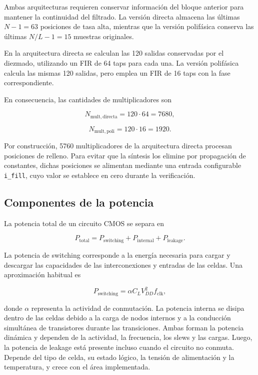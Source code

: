 \documentclass[10pt,a4paper]{article}
\begin{document}
Ambas arquitecturas requieren conservar información del bloque
anterior para mantener la continuidad del filtrado. La versión
directa almacena las últimas $N-1=63$ posiciones de tasa alta,
mientras que la versión polifásica conserva las últimas
$N/L-1=15$ muestras originales.

En la arquitectura directa se calculan las 120 salidas conservadas
por el diezmado, utilizando un FIR de 64 taps para cada una.
La versión polifásica calcula las mismas 120 salidas, pero emplea
un FIR de 16 taps con la fase correspondiente.

En consecuencia, las cantidades de multiplicadores son

\begin{equation}
N_{\mathrm{mult,directa}}=120\cdot64=7680,
\label{eq:mult-direct}
\end{equation}

\begin{equation}
N_{\mathrm{mult,poli}}=120\cdot16=1920.
\label{eq:mult-poly}
\end{equation}

Por construcción, 5760 multiplicadores de la arquitectura directa
procesan posiciones de relleno. Para evitar que la síntesis los
elimine por propagación de constantes, dichas posiciones se
alimentan mediante una entrada configurable \texttt{i\_fill},
cuyo valor se establece en cero durante la verificación.

\subsection{Componentes de la potencia}

La potencia total de un circuito CMOS se separa en

\begin{equation}
P_{\mathrm{total}}=P_{\mathrm{switching}}+P_{\mathrm{internal}}+P_{\mathrm{leakage}}.
\label{eq:power-components}
\end{equation}

La potencia de switching corresponde a la energía necesaria para cargar y descargar
las capacidades de las interconexiones y entradas de las celdas. Una aproximación
habitual es

\begin{equation}
P_{\mathrm{switching}}=\alpha C_L V_{DD}^{2}f_{\mathrm{clk}},
\label{eq:switching-power}
\end{equation}

donde $\alpha$ representa la actividad de conmutación. La potencia interna se
disipa dentro de las celdas debido a la carga de nodos internos y a la conducción
simultánea de transistores durante las transiciones. Ambas forman la potencia
dinámica y dependen de la actividad, la frecuencia, los slews y las cargas. Luego,
la potencia de leakage está presente incluso cuando el circuito no conmuta. Depende
del tipo de celda, su estado lógico, la tensión de alimentación y la temperatura, y
crece con el área implementada.
\end{document}
